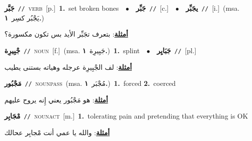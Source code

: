\documentclass[10pt,a4paper,twoside]{article} %
\begin{document}
\begin{multicols}{2}
{\setlength\topsep{0pt}\textbf{\foreignlanguage{arabic}{جَبَّر}}\ {\color{gray}\texttt{//}\color{black}}\ \textsc{verb}\ [p.]\ \textbf{1.}~set broken bones\ \ $\bullet$\ \ \setlength\topsep{0pt}\textbf{\foreignlanguage{arabic}{جَبِّر}}\ {\color{gray}\texttt{//}\color{black}}\ [c.]\ \ $\bullet$\ \ \setlength\topsep{0pt}\textbf{\foreignlanguage{arabic}{يجَبِّر}}\ {\color{gray}\texttt{//}\color{black}}\ [i.]\ \color{gray}(msa. \foreignlanguage{arabic}{يَجْبُر كسِر}~\foreignlanguage{arabic}{\textbf{١.}})\color{black}\  \begin{flushright}\color{gray}\foreignlanguage{arabic}{\textbf{\underline{\foreignlanguage{arabic}{أمثلة}}}: بتعرف تجَبِّر الأيد بس تكون مكسورة؟}\end{flushright}\color{black}} \vspace{2mm}

{\setlength\topsep{0pt}\textbf{\foreignlanguage{arabic}{جْبِيرِة}}\ {\color{gray}\texttt{//}\color{black}}\ \textsc{noun}\ [f.]\ \color{gray}(msa. \foreignlanguage{arabic}{جَبِيرِة}~\foreignlanguage{arabic}{\textbf{١.}})\color{black}\ \textbf{1.}~splint\ \ $\bullet$\ \ \setlength\topsep{0pt}\textbf{\foreignlanguage{arabic}{جَبَايِر}}\ {\color{gray}\texttt{//}\color{black}}\ [pl.]\  \begin{flushright}\color{gray}\foreignlanguage{arabic}{\textbf{\underline{\foreignlanguage{arabic}{أمثلة}}}: لف الجْبِيرِة عرجله وهياته بستنى يطيب}\end{flushright}\color{black}} \vspace{2mm}

{\setlength\topsep{0pt}\textbf{\foreignlanguage{arabic}{مَجْبُور}}\ {\color{gray}\texttt{//}\color{black}}\ \textsc{noun\textunderscore pass}\ \color{gray}(msa. \foreignlanguage{arabic}{مُجْبَر}~\foreignlanguage{arabic}{\textbf{١.}})\color{black}\ \textbf{1.}~forced  \textbf{2.}~coerced\  \begin{flushright}\color{gray}\foreignlanguage{arabic}{\textbf{\underline{\foreignlanguage{arabic}{أمثلة}}}: هو مَجْبُور يعني إِنه يروح عليهم}\end{flushright}\color{black}} \vspace{2mm}

{\setlength\topsep{0pt}\textbf{\foreignlanguage{arabic}{مْجَابِر}}\ {\color{gray}\texttt{//}\color{black}}\ \textsc{noun\textunderscore act}\ [m.]\ \textbf{1.}~tolerating pain and pretending that everything is OK\  \begin{flushright}\color{gray}\foreignlanguage{arabic}{\textbf{\underline{\foreignlanguage{arabic}{أمثلة}}}: والله يا عمي أنت مْجابِر عحالك}\end{flushright}\color{black}} \vspace{2mm}


\end{multicols}
\end{document}
